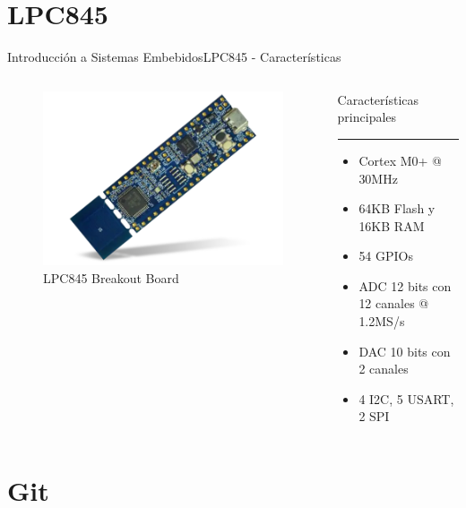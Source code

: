 \documentclass[aspectratio=169, xcolor=dvipsnames]{beamer}
\begin{document}
\section{LPC845}
\begin{frame}{Introducción a Sistemas Embebidos}{LPC845 - Características}
\begin{columns}
\begin{column}{.5\textwidth}
    \begin{figure}
        \includegraphics[width=0.75\linewidth]{resources/images/lpc845.png}
        \caption{LPC845 Breakout Board}
    \end{figure}
\end{column}
\begin{column}{.5\textwidth}
    Características principales
    \noindent\rule{\textwidth}{0.75pt}
    \begin{itemize}
        \item Cortex M0+ @ 30MHz
        \item 64KB Flash y 16KB RAM
        \item 54 GPIOs
        \item ADC 12 bits con 12 canales @ 1.2MS/s
        \item DAC 10 bits con 2 canales
        \item 4 I2C, 5 USART, 2 SPI
    \end{itemize}
\end{column}
\end{columns}
\end{frame}

\section{Git}
\end{document}
